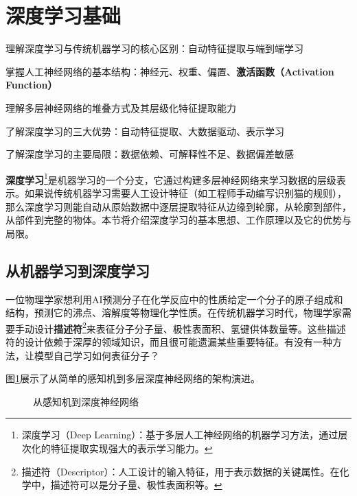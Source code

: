 \newpage
\section{深度学习基础}


\begin{sectionkeypoints}
\item 理解深度学习与传统机器学习的核心区别：自动特征提取与端到端学习
\item 掌握人工神经网络的基本结构：神经元、权重、偏置、\textbf{激活函数（Activation Function）}
\item 理解多层神经网络的堆叠方式及其层级化特征提取能力
\item 了解深度学习的三大优势：自动特征提取、大数据驱动、表示学习
\item 了解深度学习的主要局限：数据依赖、可解释性不足、数据偏差敏感
\end{sectionkeypoints}




\textbf{深度学习}\footnote{深度学习（Deep Learning）：基于多层人工神经网络的机器学习方法，通过层次化的特征提取实现强大的表示学习能力。}是机器学习的一个分支，它通过构建多层神经网络来学习数据的层级表示。如果说传统机器学习需要人工设计特征（如工程师手动编写识别猫的规则），那么深度学习则能自动从原始数据中逐层提取特征从边缘到轮廓，从轮廓到部件，从部件到完整的物体。本节将介绍深度学习的基本思想、工作原理以及它的优势与局限。



\subsection{从机器学习到深度学习}
一位物理学家想利用AI预测分子在化学反应中的性质给定一个分子的原子组成和结构，预测它的沸点、溶解度等物理化学性质。在传统机器学习时代，物理学家需要手动设计\textbf{描述符}\footnote{描述符（Descriptor）：人工设计的输入特征，用于表示数据的关键属性。在化学中，描述符可以是分子量、极性表面积等。}来表征分子分子量、极性表面积、氢键供体数量等。这些描述符的设计依赖于深厚的领域知识，而且很可能遗漏某些重要特征。有没有一种方法，让模型自己学习如何表征分子？

图\ref{fig:ch2_2_8}展示了从简单的感知机到多层深度神经网络的架构演进。
\begin{figure}[H]
\centering
{}
\caption{从感知机到深度神经网络}
\label{fig:ch2_2_8}
\end{figure}


